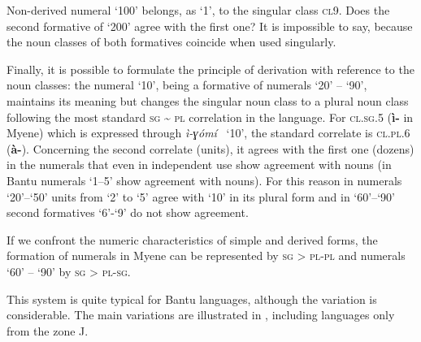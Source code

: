 Non-derived numeral ‘100’ belongs, as ‘1’, to the singular class \textsc{cl}9. Does the second formative of ‘200’ agree with the first one? It is impossible to say, because the noun classes of both formatives coincide when used singularly. 

Finally, it is possible to formulate the principle of derivation with reference to the noun classes: the numeral ‘10’, being a formative of numerals ‘20’ – ‘90’, maintains its meaning but changes the singular noun class to a plural noun class following the most standard \textsc{sg} {\textasciitilde} \textsc{pl} correlation in the language. For \textsc{cl}.\textsc{sg}.5 (\textbf{ì-} in Myene) which is expressed through \textit{ì-}\textit{ɣómí} ~‘10’, the standard correlate is \textsc{cl}.\textsc{pl}.6 (\textbf{à-}). Concerning the second correlate (units), it agrees with the first one (dozens) in the numerals that even in independent use show agreement with nouns (in Bantu numerals ‘1--5’ show agreement with nouns). For this reason in numerals ‘20’–‘50’ units from ‘2’ to ‘5’ agree with ‘10’ in its plural form and in ‘60’–‘90’ second formatives ‘6’-‘9’ do not show agreement. 

If we confront the numeric characteristics of simple and derived forms, the formation of numerals in Myene can be represented by \textsc{sg} > \textsc{pl}-\textsc{pl} and numerals ‘60’ – ‘90’ by \textsc{sg} > \textsc{pl}-\textsc{sg}.

This system is quite typical for Bantu languages, although the variation is considerable. The main variations are illustrated in , including languages only from the zone J.

